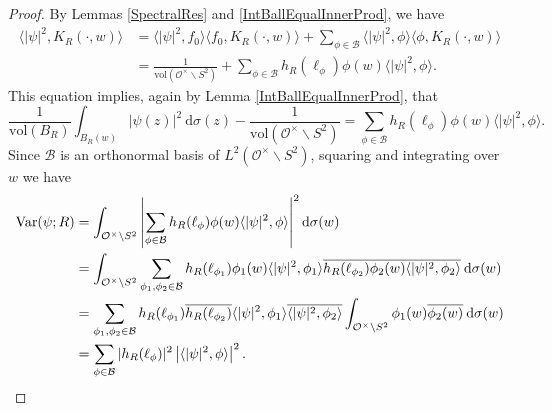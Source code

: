 \documentclass[11pt]{amsart}
\theoremstyle{definition}
\begin{document}
\begin{proof}
By Lemmas \ref{SpectralRes} and \ref{IntBallEqualInnerProd}, we have 
\begin{align*}
    \langle |\psi|^2, K_R(\cdot, w) \rangle &= \langle |\psi|^2, f_0\rangle \langle f_0, K_R(\cdot, w)\rangle + \sum_{\phi \in \mathcal{B}} \langle |\psi|^2, \phi\rangle \langle \phi, K_R(\cdot, w)\rangle \\
    &= \frac{1}{\mathrm{vol}(\mathcal{O}^{\times} \backslash S^2 )} + \sum_{\phi \in \mathcal{B}} h_R(\ell_{\phi}) \phi(w) \langle |\psi|^2 , \phi \rangle.
\end{align*}
This equation implies, again by Lemma \ref{IntBallEqualInnerProd}, that $$ \frac{1}{\mathrm{vol}(B_R)} \int_{B_R(w)} |\psi(z)|^2 \: \mathrm{d}\sigma(z) - \frac{1}{\mathrm{vol}(\mathcal{O}^{\times} \backslash S^2)} = \sum_{\phi \in \mathcal{B}} h_R(\ell_{\phi}) \phi(w) \langle |\psi|^2 , \phi \rangle.$$ Since $\mathcal{B}$ is an orthonormal basis of $L^2(\mathcal{O}^{\times} \backslash S^2)$, squaring and integrating over $w$ we have
\begin{align*}
    \mathrm{Var}(\psi;R) &= \int_{\mathcal{O}^{\times} \backslash S^2} \left| \sum_{\phi \in \mathcal{B}} h_R(\ell_{\phi}) \phi(w) \langle |\psi|^2 , \phi \rangle \right|^2 \mathrm{d}\sigma(w) \\
    &= \int_{\mathcal{O}^{\times} \backslash S^2} \sum_{\phi_1, \phi_2 \in \mathcal{B}} h_R(\ell_{\phi_1}) \phi_1(w) \langle |\psi|^2 , \phi_1 \rangle \overline{h_R(\ell_{\phi_2}) \phi_2(w) \langle |\psi|^2 , \phi_2 \rangle} \: \mathrm{d}\sigma(w) \\
    &= \sum_{\phi_1, \phi_2 \in \mathcal{B}} h_R(\ell_{\phi_1}) \overline{h_R(\ell_{\phi_2})}  \langle |\psi|^2 , \phi_1 \rangle \overline{\langle |\psi|^2 , \phi_2 \rangle} \int_{\mathcal{O}^{\times} \backslash S^2} \phi_1(w) \overline{\phi_2(w)} \: \mathrm{d}\sigma(w) \\
    &= \sum_{\phi \in \mathcal{B}} |h_R(\ell_{\phi})|^2 \left| \langle |\psi|^2, \phi \rangle \right|^2. \qedhere
\end{align*}
\end{proof}
\end{document}
